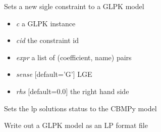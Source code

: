 \documentclass[a4paper,11pt,english]{sphinxmanual}
\begin{document}

\begin{fulllineitems}
\label{modules_doc:cbmpy.CBGLPK.glpk_setSingleConstraint}
Sets a new sigle constraint to a GLPK model
\begin{itemize}
\item {} 
\emph{c} a GLPK instance

\item {} 
\emph{cid} the constraint id

\item {} 
\emph{expr} a list of (coefficient, name) pairs

\item {} 
\emph{sense} {[}default='G'{]} LGE

\item {} 
\emph{rhs} {[}default=0.0{]} the right hand side

\end{itemize}

\end{fulllineitems}


\begin{fulllineitems}
\label{modules_doc:cbmpy.CBGLPK.glpk_setSolutionStatusToModel}
Sets the lp solutions status to the CBMPy model

\end{fulllineitems}


\begin{fulllineitems}
\label{modules_doc:cbmpy.CBGLPK.glpk_writeLPtoLPTfile}
Write out a GLPK model as an LP format file

\end{fulllineitems}

\end{document}
